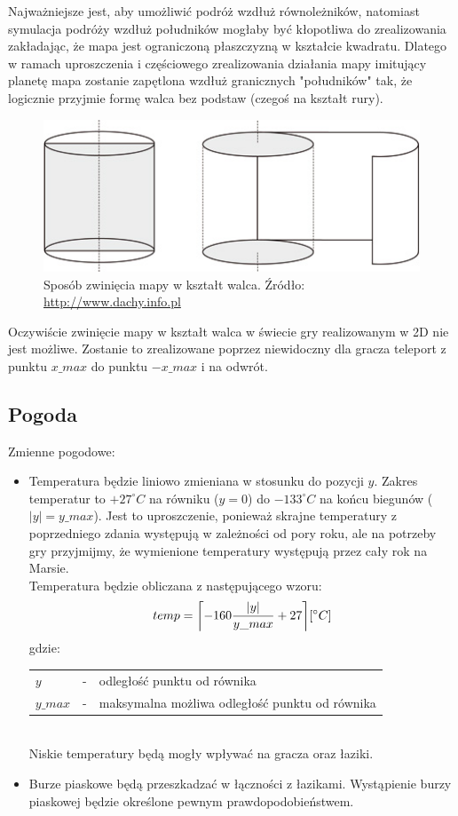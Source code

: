 \documentclass[a4paper,12pt]{article}
\DeclarePairedDelimiter{\ceil}{\lceil}{\rceil}
\begin{document}
Najważniejsze jest, aby umożliwić podróż wzdłuż równoleżników, natomiast symulacja podróży wzdłuż południków mogłaby być kłopotliwa do zrealizowania zakładając, że mapa jest ograniczoną płaszczyzną w kształcie kwadratu. Dlatego w ramach uproszczenia i częściowego zrealizowania działania mapy imitujący planetę mapa zostanie zapętlona wzdłuż granicznych "południków" tak, że logicznie przyjmie formę walca bez podstaw (czegoś na kształt rury).
\begin{figure}[h]
	\centering
	\includegraphics[scale=0.5]{walec}
	\caption{Sposób zwinięcia mapy w kształt walca. Źródło: \url{http://www.dachy.info.pl}}
\end{figure}

Oczywiście zwinięcie mapy w kształt walca w świecie gry realizowanym w 2D nie jest możliwe. Zostanie to zrealizowane poprzez niewidoczny dla gracza teleport z punktu $x\_max$ do punktu $-x\_max$ i na odwrót.
\subsection{Pogoda}
Zmienne pogodowe:
\begin{itemize}
	\item Temperatura będzie liniowo zmieniana w stosunku do pozycji $y$. Zakres temperatur to $+27^{\circ}C$ na równiku ($y = 0$) do $-133^{\circ}C$ na końcu biegunów ($|y| = y\_max$). Jest to uproszczenie, ponieważ skrajne temperatury z poprzedniego zdania występują w zależności od pory roku, ale na potrzeby gry przyjmijmy, że wymienione temperatury występują przez cały rok na Marsie.\\
	Temperatura będzie obliczana z następującego wzoru:
	\begin{equation}
	\label{eqn:tempeq}
	temp = \ceil[\bigg]{-160\frac{|y|}{y\_max} + 27} [^{\circ}C]
	\end{equation}
	gdzie:\\
	\begin{tabular}{l l l}
	$y$ & - & odległość punktu od równika\\
	$y\_max$ & - & maksymalna możliwa odległość punktu od równika
	\end{tabular}
	\vspace{1em} \\ Niskie temperatury będą mogły wpływać na gracza oraz łaziki.
	\item Burze piaskowe będą przeszkadzać w łączności z łazikami. Wystąpienie burzy piaskowej będzie określone pewnym prawdopodobieństwem.
\end{itemize}
\end{document}
